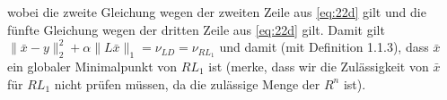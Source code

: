\documentclass[ngerman, a4paper,12pt]{article}
\begin{document}
wobei die zweite Gleichung wegen der zweiten Zeile aus \eqref{eq:22d} gilt und die fünfte Gleichung wegen der dritten Zeile aus \eqref{eq:22d} gilt. Damit gilt $\|\bar{x} - y\|_2^2 + \alpha \| L\bar{x}\|_1 = \nu_{LD} = \nu_{RL_1}$ und damit (mit Definition 1.1.3), dass $\bar{x}$ ein globaler Minimalpunkt von $RL_1$ ist (merke, dass wir die Zulässigkeit von $\bar{x}$ für $RL_1$ nicht prüfen müssen, da die zulässige Menge der $R^n$ ist).

\end{document}
